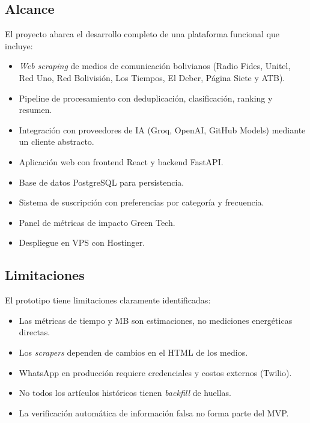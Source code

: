 \subsection{Alcance}

El proyecto abarca el desarrollo completo de una plataforma funcional que incluye:
\begin{itemize}[nosep]
    \item \textit{Web scraping} de medios de comunicaci\'on bolivianos (Radio Fides, Unitel, Red Uno, Red Bolivisi\'on, Los Tiempos, El Deber, P\'agina Siete y ATB).
    \item Pipeline de procesamiento con deduplicaci\'on, clasificaci\'on, ranking y resumen.
    \item Integraci\'on con proveedores de IA (Groq, OpenAI, GitHub Models) mediante un cliente abstracto.
    \item Aplicaci\'on web con frontend React y backend FastAPI.
    \item Base de datos PostgreSQL para persistencia.
    \item Sistema de suscripci\'on con preferencias por categor\'ia y frecuencia.
    \item Panel de m\'etricas de impacto Green Tech.
    \item Despliegue en VPS con Hostinger.
\end{itemize}

\subsection{Limitaciones}

El prototipo tiene limitaciones claramente identificadas:
\begin{itemize}[nosep]
    \item Las m\'etricas de tiempo y MB son estimaciones, no mediciones energ\'eticas directas.
    \item Los \textit{scrapers} dependen de cambios en el HTML de los medios.
    \item WhatsApp en producci\'on requiere credenciales y costos externos (Twilio).
    \item No todos los art\'iculos hist\'oricos tienen \textit{backfill} de huellas.
    \item La verificaci\'on autom\'atica de informaci\'on falsa no forma parte del MVP.
\end{itemize}
